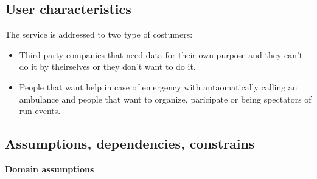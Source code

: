 \documentclass[../main.tex]{subfiles}
\begin{document}
\subsection{User characteristics}
The service is addressed to two type of costumers:
\begin{itemize}
	\item Third party companies that need data for their own purpose and they can't do it by theirselves or they don't want to do it.
	\item People that want help in case of emergency with autaomatically calling an ambulance and people that want to organize, paricipate or being spectators of run events.
\end{itemize}

\subsection{Assumptions, dependencies, constrains}

{\bf Domain assumptions}
\end{document}
